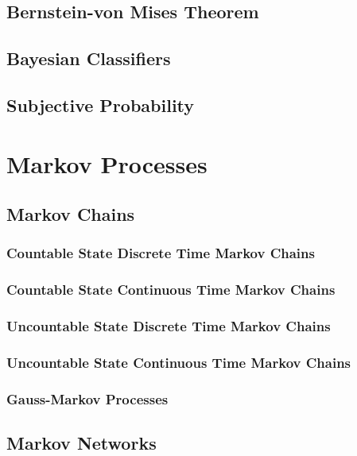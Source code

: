 \documentclass[11pt]{report} %
\begin{document}
\section{Bernstein-von Mises Theorem}

\section{Bayesian Classifiers}

\section{Subjective Probability \cite{Schervish1995}}

\chapter{Markov Processes}

\section{Markov Chains}

\subsection{Countable State Discrete Time Markov Chains}

\subsection{Countable State Continuous Time Markov Chains}

\subsection{Uncountable State Discrete Time Markov Chains}

\subsection{Uncountable State Continuous Time Markov Chains}

\subsection{Gauss-Markov Processes}

\section{Markov Networks}
\end{document}
